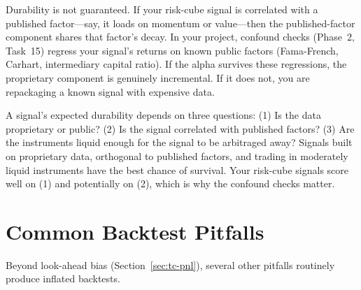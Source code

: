 Durability is not guaranteed.  If your risk-cube signal is correlated with a published factor---say, it loads on momentum or value---then the published-factor component shares that factor's decay.  In your project, confound checks (Phase~2, Task~15) regress your signal's returns on known public factors (Fama-French, Carhart, intermediary capital ratio).  If the alpha survives these regressions, the proprietary component is genuinely incremental.  If it does not, you are repackaging a known signal with expensive data.

\begin{keyidea}
A signal's expected durability depends on three questions: (1) Is the data proprietary or public? (2) Is the signal correlated with published factors? (3) Are the instruments liquid enough for the signal to be arbitraged away?  Signals built on proprietary data, orthogonal to published factors, and trading in moderately liquid instruments have the best chance of survival.  Your risk-cube signals score well on (1) and potentially on (2), which is why the confound checks matter.
\end{keyidea}


\section{Common Backtest Pitfalls}
\label{sec:backtest-pitfalls}

Beyond look-ahead bias (Section~\ref{sec:tc-pnl}), several other pitfalls routinely produce inflated backtests.

